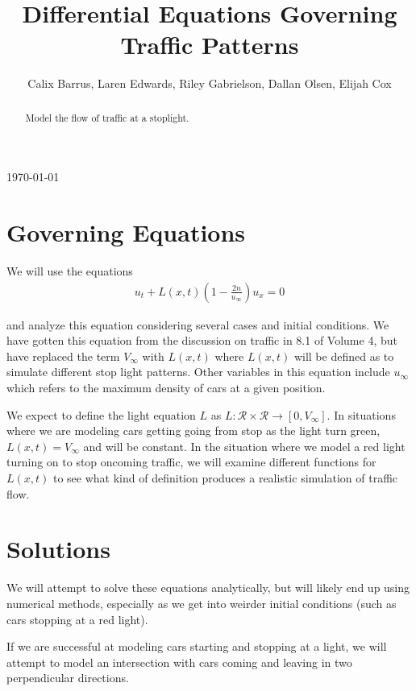 \documentclass[12pt]{article}
\begin{document}
\title{Differential Equations Governing Traffic Patterns}

\author{Calix Barrus, Laren Edwards, Riley Gabrielson, Dallan Olsen, Elijah Cox}



\maketitle
\today
\begin{abstract}
Model the flow of traffic at a stoplight. 
\end{abstract}

\section{Governing Equations} 
We will use the equations 
\begin{align*}
    u_t + L(x, t) ( 1 - \frac{2n}{u_\infty} ) u_x = 0 
\end{align*}

and analyze this equation considering several cases and initial conditions. We have gotten this equation from the discussion on traffic in 8.1 of Volume 4, but have replaced the term $V_\infty$ with $L(x, t)$ where $L(x, t)$ will be defined as to simulate different stop light patterns. Other variables in this equation include $u_\infty$ which refers to the maximum density of cars at a given position. 

We expect to define the light equation $L$ as $L : \mathcal{R} \times \mathcal{R} \to [0, V_\infty]$. In situations where we are modeling cars getting going from stop as the light turn green, $L(x, t) = V_\infty$ and will be constant. In the situation where we model a red light turning on to stop oncoming traffic, we will examine different functions for $L(x, t)$ to see what kind of definition produces a realistic simulation of traffic flow. 

\section{Solutions}

We will attempt to solve these equations analytically, but will likely end up using numerical methods, especially as we get into weirder initial conditions (such as cars stopping at a red light). 

If we are successful at modeling cars starting and stopping at a light, we will attempt to model an intersection with cars coming and leaving in two perpendicular directions.
\end{document}
